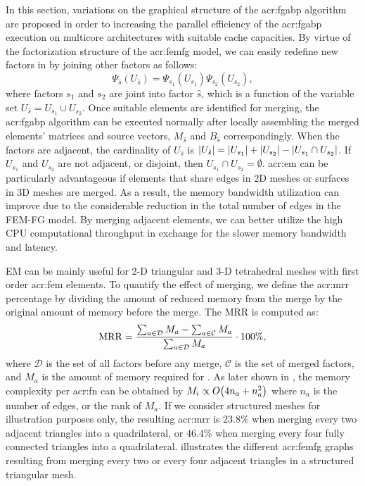 In this section, variations on the graphical structure of the \gls{acr:fgabp} algorithm are proposed in order to increasing the parallel efficiency of the \gls{acr:fgabp} execution on multicore architectures with suitable cache capacities.
By virtue of the factorization structure of the \gls{acr:femfg} model, we can easily redefine new factors in  by joining other factors as follows:
\begin{equation}
	\Psi_{\hat{s}}(U_{\hat{s}}) = \Psi_{s_1}(U_{s_1}) \Psi_{s_2}(U_{s_2}),
	\label{eqn:jpdf}
\end{equation}
where factors $s_1$ and $s_2$ are joint into factor $\hat{s}$, which is a function of the variable set $U_{\hat{s}} = U_{s_1} \cup U_{s_2}$.
Once suitable elements are identified for merging, the \gls{acr:fgabp} algorithm can be executed normally after locally assembling the merged elements' matrices and source vectors, $M_{\hat{s}}$ and $B_{\hat{s}}$ correspondingly.
When the factors are adjacent, the cardinality of $U_{\hat{s}}$ is $\left\vert{U_{\hat{s}}}\right\vert = \left\vert{U_{s_1}}\right\vert + \left\vert{U_{s_2}}\right\vert - \left\vert{U_{s_1} \cap U_{s_2}}\right\vert$.
If $U_{s_1}$ and $U_{s_2}$ are not adjacent, or disjoint, then $U_{s_1} \cap U_{s_2} = \emptyset$.
\Gls{acr:em} can be particularly advantageous if elements that share edges in 2D meshes or surfaces in 3D meshes are merged.
As a result, the memory bandwidth utilization can improve due to the considerable reduction in the total number of edges in the FEM-FG model. 
By merging adjacent elements, we can better utilize the high CPU computational throughput in exchange for the slower memory bandwidth and latency.


EM can be mainly useful for 2-D triangular and 3-D tetrahedral meshes with first order \gls{acr:fem} elements.
To quantify the effect of merging, we define the \gls{acr:mrr} percentage by dividing the amount of reduced memory from the merge by the original amount of memory before the merge.
The MRR is computed as:
\begin{equation}
	 \operatorname{MRR}  = \frac{\sum_{a \in \mathcal{D}}M_a - \sum_{a \in \mathcal{C}}M_a}{\sum_{a \in \mathcal{D}}M_a} \cdot 100\%,
\end{equation}
where $\mathcal{D}$ is the set of all factors before any merge, $\mathcal{C}$ is the set of merged factors, and $M_a$ is the amount of memory required for .
As later shown in , the memory complexity per \gls{acr:fn} can be obtained by $M_i \propto  O\bigl(4n_a+n_a^2\bigr)$ where $n_a$ is the number of  edges, or the rank of $M_a$.
If we consider structured meshes for illustration purposes only, the resulting \gls{acr:mrr} is 23.8\% when merging every two adjacent triangles into a quadrilateral, or 46.4\% when merging every four fully connected triangles into a quadrilateral.
 illustrates the different \gls{acr:femfg} graphs resulting from merging every two or every four adjacent triangles in a structured triangular mesh.


